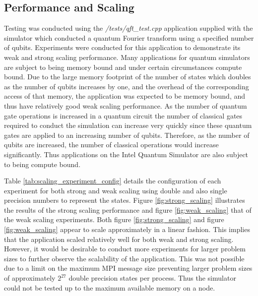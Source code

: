 \subsection{Performance and Scaling}
\label{sec:performance_and_scaling}
Testing was conducted using the \textit{/tests/qft\_test.cpp} application supplied with the simulator which conducted a quantum Fourier transform using a specified number of qubits. Experiments were conducted for this application to demonstrate its weak and strong scaling performance. Many applications for quantum simulators are subject to being memory bound and under certain circumstances compute bound. Due to the large memory footprint of the number of states which doubles as the number of qubits increases by one, and the overhead of the corresponding access of that memory, the application was expected to be memory bound, and thus have relatively good weak scaling performance. As the number of quantum gate operations is increased in a quantum circuit the number of classical gates required to conduct the simulation can increase very quickly since these quantum gates are applied to an increasing number of qubits. Therefore, as the number of qubits are increased, the number of classical operations would increase significantly. Thus applications on the Intel Quantum Simulator are also subject to being compute bound.

Table \ref{tab:scaling_experiment_config} details the configuration of each experiment for both strong and weak scaling using double and also single precision numbers to represent the states. Figure \ref{fig:strong_scaling} illustrates the results of the strong scaling performance and figure \ref{fig:weak_scaling} that of the weak scaling experiments.
Both figure \ref{fig:strong_scaling} and figure \ref{fig:weak_scaling} appear to scale approximately in a linear fashion. This implies that the application scaled relatively well for both weak and strong scaling. However, it would be desirable to conduct more experiments for larger problem sizes to further observe the scalability of the application. This was not possible due to a limit on the maximum MPI message size preventing larger problem sizes of approximately $2^{27}$ double precision states per process. Thus the simulator could not be tested up to the maximum available memory on a node. 

